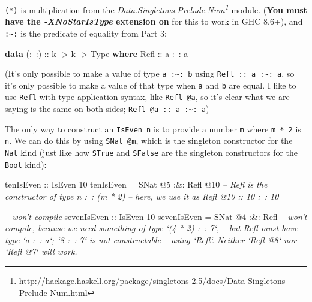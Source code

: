 \documentclass[]{article}
\newenvironment{Shaded}{}{}
\newcommand{\CommentTok}[1]{\textcolor[rgb]{0.38,0.63,0.69}{\textit{#1}}}
\newcommand{\DataTypeTok}[1]{\textcolor[rgb]{0.56,0.13,0.00}{#1}}
\newcommand{\DecValTok}[1]{\textcolor[rgb]{0.25,0.63,0.44}{#1}}
\newcommand{\FunctionTok}[1]{\textcolor[rgb]{0.02,0.16,0.49}{#1}}
\newcommand{\KeywordTok}[1]{\textcolor[rgb]{0.00,0.44,0.13}{\textbf{#1}}}
\newcommand{\NormalTok}[1]{#1}
\newcommand{\OtherTok}[1]{\textcolor[rgb]{0.00,0.44,0.13}{#1}}
\renewcommand{\href}[2]{#2\footnote{\url{#1}}}
\begin{document}
\begin{enumerate}
  \texttt{(*)} is multiplication from the
  \emph{\href{http://hackage.haskell.org/package/singletons-2.5/docs/Data-Singletons-Prelude-Num.html}{Data.Singletons.Prelude.Num}}
  module. (\textbf{You must have the \emph{-XNoStarIsType} extension on} for
  this to work in GHC 8.6+), and \texttt{:\textasciitilde{}:} is the predicate
  of equality from Part 3:

\begin{Shaded}
\begin{Highlighting}[]
\KeywordTok{data}\OtherTok{ (:~:) ::}\NormalTok{ k }\OtherTok{->}\NormalTok{ k }\OtherTok{->} \DataTypeTok{Type} \KeywordTok{where}
    \DataTypeTok{Refl}\OtherTok{ ::}\NormalTok{ a }\FunctionTok{:~:}\NormalTok{ a}
\end{Highlighting}
\end{Shaded}

  (It's only possible to make a value of type \texttt{a\ :\textasciitilde{}:\ b}
  using \texttt{Refl\ ::\ a\ :\textasciitilde{}:\ a}, so it's only possible to
  make a value of that type when \texttt{a} and \texttt{b} are equal. I like to
  use \texttt{Refl} with type application syntax, like \texttt{Refl\ @a}, so
  it's clear what we are saying is the same on both sides;
  \texttt{Refl\ @a\ ::\ a\ :\textasciitilde{}:\ a})

  The only way to construct an \texttt{IsEven\ n} is to provide a number
  \texttt{m} where \texttt{m\ *\ 2} is \texttt{n}. We can do this by using
  \texttt{SNat\ @m}, which is the singleton constructor for the \texttt{Nat}
  kind (just like how \texttt{STrue} and \texttt{SFalse} are the singleton
  constructors for the \texttt{Bool} kind):

\begin{Shaded}
\begin{Highlighting}[]
\OtherTok{tenIsEven ::} \DataTypeTok{IsEven} \DecValTok{10}
\NormalTok{tenIsEven }\FunctionTok{=} \DataTypeTok{SNat} \FunctionTok{@}\DecValTok{5} \FunctionTok{:&:} \DataTypeTok{Refl} \FunctionTok{@}\DecValTok{10}
    \CommentTok{-- Refl is the constructor of type n :~: (m * 2)}
    \CommentTok{-- here, we use it as Refl @10 :: 10 :~: 10}

\CommentTok{-- won't compile}
\OtherTok{sevenIsEven ::} \DataTypeTok{IsEven} \DecValTok{10}
\NormalTok{sevenIsEven }\FunctionTok{=} \DataTypeTok{SNat} \FunctionTok{@}\DecValTok{4} \FunctionTok{:&:} \DataTypeTok{Refl}
    \CommentTok{-- won't compile, because we need something of type `(4 * 2) :~: 7`,}
    \CommentTok{-- but Refl must have type `a :~: a`; `8 :~: 7` is not constructable}
    \CommentTok{-- using `Refl`.  Neither `Refl @8` nor `Refl @7` will work.}
\end{Highlighting}
\end{Shaded}


\end{enumerate}
\end{document}
